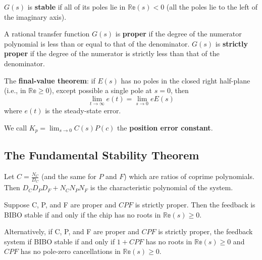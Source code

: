 \documentclass[12pt]{article}
\begin{document}
$G(s)$ is {\bf stable} if all of its poles lie in $\mathbb{Re}(s) < 0$ (all the poles lie to the left of the imaginary axis).

A rational transfer function $G(s)$ is {\bf proper} if the degree of the numerator polynomial is less than or equal to that of the denominator. $G(s)$ is {\bf strictly proper} if the degree of the numerator is strictly less than that of the denominator.

The {\bf final-value theorem}: if $E(s)$ has no poles in the closed right half-plane (i.e., in $\mathbb{Re} \geq 0$), except possible a single pole at $s = 0$, then \[ \lim_{t\to\infty} e(t) = \lim_{s\to 0} eE(s) \] where $e(t)$ is the steady-state error.

We call $K_p = \lim_{s\to 0} C(s) P(c)$ the {\bf position error constant}.

\subsection{The Fundamental Stability Theorem}
Let $C = \frac{N_C}{D_C}$ (and the same for $P$ and $F$) which are ratios of coprime polynomials. Then $D_CD_PD_F + N_CN_PN_F$ is the characteristic polynomial of the system.

Suppose C, P, and F are proper and $CPF$ is strictly proper. Then the feedback is BIBO stable if and only if the chip has no roots in $\mathbb{Re}(s) \geq 0$.

Alternatively, if C, P, and F are proper and $CPF$ is strictly proper, the feedback system if BIBO stable if and only if $1 + CPF$ has no roots in $\mathbb{Re}(s) \geq 0$ and $CPF$ has no pole-zero cancellations in $\mathbb{Re}(s) \geq 0$.
\end{document}
